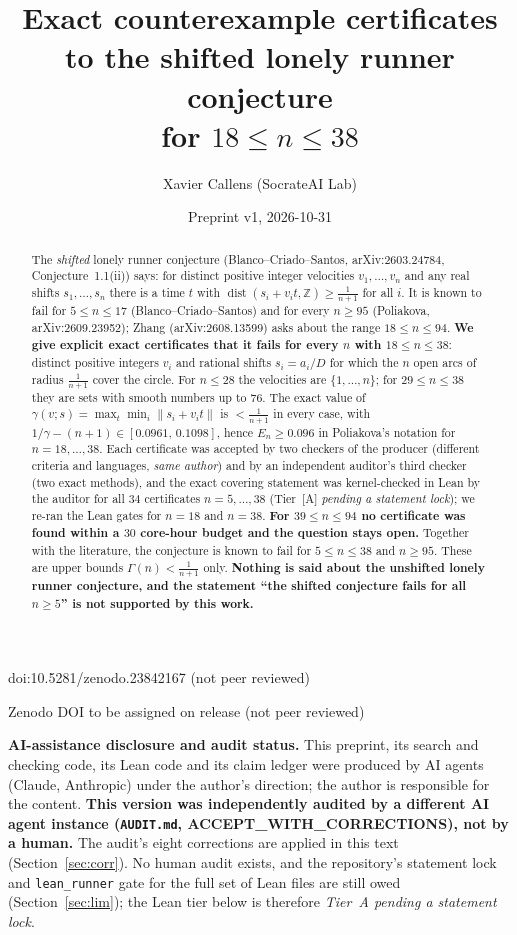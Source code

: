\documentclass[10pt]{article}
\title{Exact counterexample certificates to the shifted lonely runner conjecture\\
for $18\le n\le 38$}
\author{Xavier Callens (SocrateAI Lab)}
\date{Preprint v1, 2026-10-31}
\newcommand{\tier}[1]{\textsf{[#1]}}
\newcommand{\tA}{\tier{A}}
\newcommand{\Z}{\mathbb{Z}}
\newcommand{\dist}{\operatorname{dist}}
\begin{document}
\maketitle
\begin{center}\small doi:10.5281/zenodo.23842167 \quad (not peer reviewed)\end{center}

\begin{center}\small Zenodo DOI to be assigned on release \quad (not peer reviewed)\end{center}

\noindent\textbf{AI-assistance disclosure and audit status.} This preprint, its search and checking code, its Lean code and its claim ledger were
produced by AI agents (Claude, Anthropic) under the author's direction; the author is responsible for the content.
\textbf{This version was independently audited by a different AI agent instance (\texttt{AUDIT.md}, ACCEPT\_WITH\_CORRECTIONS), not by a human.}
The audit's eight corrections are applied in this text (Section~\ref{sec:corr}). No human audit exists, and the repository's statement lock and \texttt{lean\_runner} gate for the full set of Lean files are still owed (Section~\ref{sec:lim}); the Lean tier below is therefore \emph{Tier~A pending a statement lock}.

\begin{abstract}
The \emph{shifted} lonely runner conjecture (Blanco--Criado--Santos, arXiv:2603.24784, Conjecture~1.1(ii)) says: for distinct positive integer velocities $v_1,\dots,v_n$ and any real shifts $s_1,\dots,s_n$ there is a time $t$ with $\dist(s_i+v_it,\Z)\ge\frac1{n+1}$ for all $i$. It is known to fail for $5\le n\le17$ (Blanco--Criado--Santos) and for every $n\ge95$ (Poliakova, arXiv:2609.23952); Zhang (arXiv:2608.13599) asks about the range $18\le n\le94$.
\textbf{We give explicit exact certificates that it fails for every $n$ with $18\le n\le 38$}: distinct positive integers $v_i$ and rational shifts $s_i=a_i/D$ for which the $n$ open arcs of radius $\frac1{n+1}$ cover the circle. For $n\le28$ the velocities are $\{1,\dots,n\}$; for $29\le n\le38$ they are sets with smooth numbers up to $76$. The exact value of $\gamma(v;s)=\max_t\min_i\|s_i+v_it\|$ is $<\frac1{n+1}$ in every case, with $1/\gamma-(n+1)\in[0.0961,\,0.1098]$, hence $E_n\ge0.096$ in Poliakova's notation for $n=18,\dots,38$.
Each certificate was accepted by two checkers of the producer (different criteria and languages, \emph{same author}) and by an independent auditor's third checker (two exact methods), and the exact covering statement was kernel-checked in Lean by the auditor for all $34$ certificates $n=5,\dots,38$ (Tier~\tA{} \emph{pending a statement lock}); we re-ran the Lean gates for $n=18$ and $n=38$.
\textbf{For $39\le n\le94$ no certificate was found within a $30$ core-hour budget and the question stays open.} Together with the literature, the conjecture is known to fail for $5\le n\le38$ and $n\ge95$. These are upper bounds $\Gamma(n)<\frac1{n+1}$ only. \textbf{Nothing is said about the unshifted lonely runner conjecture, and the statement ``the shifted conjecture fails for all $n\ge5$'' is not supported by this work.}
\end{abstract}
\end{document}
